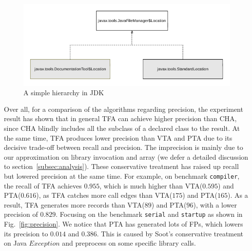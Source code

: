 \documentclass{fac}
\newcommand\eg{\textit{e.g.\ }}
\begin{document}

\begin{figure}
\centering
\includegraphics[scale=1]{cha-hierarchy.pdf}
\caption{A simple hierarchy in JDK}
\label{fig:cha-hierarchy}
\end{figure}


Over all, for a comparison of the algorithms regarding precision, the experiment result has shown that in general TFA can achieve higher precision than CHA, since CHA blindly includes all the subclass of a declared class to the result. At the same time, TFA produces lower precision than VTA and PTA due to its decisive trade-off between recall and precision. The imprecision is mainly due to our approximation on library invocation and array (we defer a detailed discussion to section~\ref{subsec:analysis}). These conservative treatment has raised up recall but lowered precision at the same time. For example, on benchmark \texttt{compiler}, the recall of TFA achieves $0.955$, which is much higher than VTA($0.595$) and PTA($0.616$), as TFA catches more call edges than VTA($175$) and PTA($165$). As a result, TFA generates more records than VTA($89$) and PTA($96$), with a lower precision of $0.829$. Focusing on the benchmark \texttt{serial} and \texttt{startup} as shown in Fig.~\ref{fig:precision}. We notice that PTA has generated lots of FPs, which lowers its precision to $0.014$ and $0.386$. This is caused by Soot's conservative treatment on Java $Exception$ and preprocess on some specific library calls. %
\end{document}
